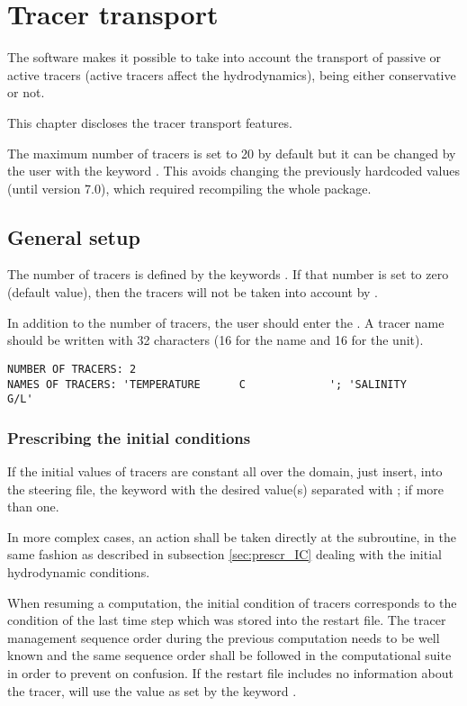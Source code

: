 \chapter{Tracer transport}

The  software makes it possible to take into account the transport of
passive or active tracers (active tracers affect the hydrodynamics), being
either conservative or not.

This chapter discloses the tracer transport features.

The maximum number of tracers is set to 20 by default but it can be changed by
the user with the keyword .
This avoids changing the previously hardcoded values (until version 7.0),
which required recompiling the whole package.

\section{General setup}

The number of tracers is defined by the keywords . If
that number is set to zero (default value), then the tracers will not be taken
into account by .

In addition to the number of tracers, the user should enter the . A tracer name should be written with 32 characters
(16 for the name and 16 for the unit).

\begin{lstlisting}[language=TelemacCas]
NUMBER OF TRACERS: 2
NAMES OF TRACERS: 'TEMPERATURE      C             '; 'SALINITY                     G/L'
\end{lstlisting}


\subsection{Prescribing the initial conditions}

If the initial values of tracers are constant all over the domain, just insert,
into the steering file, the keyword  with the
desired value(s) separated with ; if more than one.

In more complex cases, an action shall be taken directly at the 
subroutine, in the same fashion as described in subsection \ref{sec:prescr_IC}
dealing with the initial hydrodynamic conditions.

When resuming a computation, the initial condition of tracers corresponds to
the condition of the last time step which was stored into the restart file.
The tracer management sequence order during the previous computation needs to
be well known and the same sequence order shall be followed in the
computational suite in order to prevent on confusion. If the restart file
includes no information about the tracer,  will use the value as set
by the keyword .


